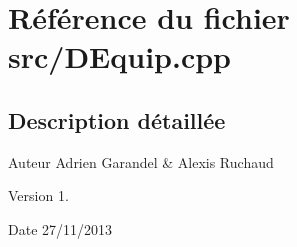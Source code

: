 \section{Référence du fichier src/\-D\-Equip.cpp}
\label{_d_equip_8cpp}


\subsection{Description détaillée}
\begin{DoxyAuthor}{Auteur}
Adrien Garandel \& Alexis Ruchaud 
\end{DoxyAuthor}
\begin{DoxyVersion}{Version}
1. 
\end{DoxyVersion}
\begin{DoxyDate}{Date}
27/11/2013 
\end{DoxyDate}
